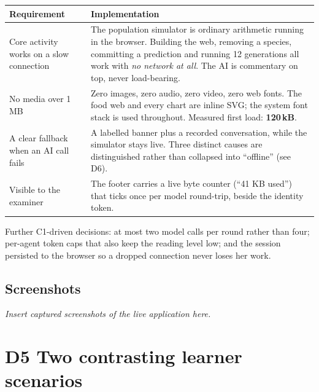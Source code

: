 \documentclass[11pt,a4paper]{article}
\begin{document}
\begin{longtable}{@{}p{5.2cm}p{10.4cm}@{}}
\toprule
\textbf{Requirement} & \textbf{Implementation}\\
\midrule
\endhead
Core activity works on a slow connection &
The population simulator is ordinary arithmetic running in the browser. Building the web,
removing a species, committing a prediction and running 12 generations all work with
\emph{no network at all}. The AI is commentary on top, never load-bearing.\\
\addlinespace
No media over 1\,MB &
Zero images, zero audio, zero video, zero web fonts. The food web and every chart are inline
SVG; the system font stack is used throughout. Measured first load: \textbf{120\,kB}.\\
\addlinespace
A clear fallback when an AI call fails &
A labelled banner plus a recorded conversation, while the simulator stays live. Three distinct
causes are distinguished rather than collapsed into ``offline'' (see D6).\\
\addlinespace
Visible to the examiner &
The footer carries a live byte counter (``41 KB used'') that ticks once per model round-trip,
beside the identity token.\\
\bottomrule
\end{longtable}

Further C1-driven decisions: at most two model calls per round rather than four; per-agent token
caps that also keep the reading level low; and the session persisted to the browser so a dropped
connection never loses her work.

\subsection*{Screenshots}

\textit{Insert captured screenshots of the live application here.}


\section{D5 \quad Two contrasting learner scenarios}
\end{document}

